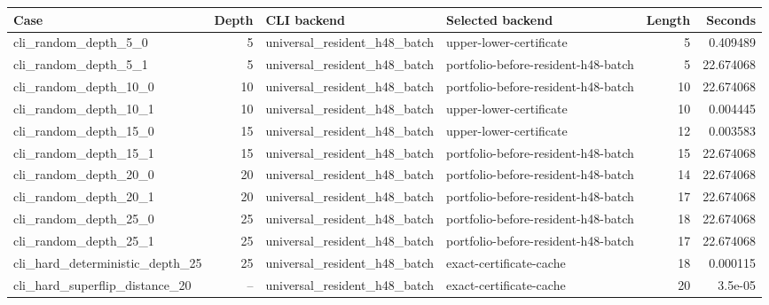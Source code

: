 {\small
\begin{tabular}{lrllrr}
\hline
Case & Depth & CLI backend & Selected backend & Length & Seconds \\
\hline
cli\_random\_depth\_5\_0 & 5 & universal\_resident\_h48\_batch & upper-lower-certificate & 5 & 0.409489 \\
cli\_random\_depth\_5\_1 & 5 & universal\_resident\_h48\_batch & portfolio-before-resident-h48-batch & 5 & 22.674068 \\
cli\_random\_depth\_10\_0 & 10 & universal\_resident\_h48\_batch & portfolio-before-resident-h48-batch & 10 & 22.674068 \\
cli\_random\_depth\_10\_1 & 10 & universal\_resident\_h48\_batch & upper-lower-certificate & 10 & 0.004445 \\
cli\_random\_depth\_15\_0 & 15 & universal\_resident\_h48\_batch & upper-lower-certificate & 12 & 0.003583 \\
cli\_random\_depth\_15\_1 & 15 & universal\_resident\_h48\_batch & portfolio-before-resident-h48-batch & 15 & 22.674068 \\
cli\_random\_depth\_20\_0 & 20 & universal\_resident\_h48\_batch & portfolio-before-resident-h48-batch & 14 & 22.674068 \\
cli\_random\_depth\_20\_1 & 20 & universal\_resident\_h48\_batch & portfolio-before-resident-h48-batch & 17 & 22.674068 \\
cli\_random\_depth\_25\_0 & 25 & universal\_resident\_h48\_batch & portfolio-before-resident-h48-batch & 18 & 22.674068 \\
cli\_random\_depth\_25\_1 & 25 & universal\_resident\_h48\_batch & portfolio-before-resident-h48-batch & 17 & 22.674068 \\
cli\_hard\_deterministic\_depth\_25 & 25 & universal\_resident\_h48\_batch & exact-certificate-cache & 18 & 0.000115 \\
cli\_hard\_superflip\_distance\_20 & -- & universal\_resident\_h48\_batch & exact-certificate-cache & 20 & 3.5e-05 \\
\hline
\end{tabular}
}
